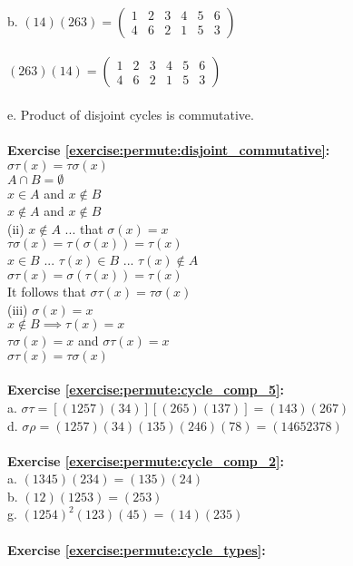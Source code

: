 \\
b. $(14)(263)=\begin{pmatrix}
1 & 2 & 3 & 4 & 5 & 6\\
4 & 6 & 2 & 1 & 5 & 3
\end{pmatrix}$\\
\\
$(263)(14)=\begin{pmatrix}
1 & 2 & 3 & 4 & 5 & 6\\
4 & 6 & 2 & 1 & 5 & 3
\end{pmatrix}$\\
\\
e. Product of disjoint cycles is commutative.\\
\\
\textbf{Exercise \ref{exercise:permute:disjoint_commutative}:}\\
$\sigma\tau(x)=\tau\sigma(x)$\\
$A\cap B=\emptyset$\\
$x\in A$ and $x\not\in B$\\
$x\not\in A$ and $x\not\in B$\\
(ii) $x\not\in A$ ... that $\sigma(x)=x$\\
$\tau\sigma(x)=\tau(\sigma(x))=\tau(x)$\\
$x\in B$ ... $\tau(x)\in B$ ... $\tau(x)\not\in A$\\
$\sigma\tau(x)=\sigma(\tau(x))=\tau(x)$\\
It follows that $\sigma\tau(x)=\tau\sigma(x)$\\
(iii) $\sigma(x)=x$\\
$x\not\in B \implies \tau(x)=x$\\
$\tau\sigma(x)=x$ and $\sigma\tau(x)=x$\\
$\sigma\tau(x)=\tau\sigma(x)$\\
\\
\textbf{Exercise \ref{exercise:permute:cycle_comp_5}:}\\
a. $\sigma\tau=[(1257)(34)][(265)(137)]=(143)(267)$\\
d. $\sigma\rho=(1257)(34)(135)(246)(78)=(14652378)$\\
\\
\textbf{Exercise \ref{exercise:permute:cycle_comp_2}:}\\
a. $(1345)(234)=(135)(24)$\\
b. $(12)(1253)=(253)$\\
g. $(1254)^2(123)(45)=(14)(235)$\\
\\
\textbf{Exercise \ref{exercise:permute:cycle_types}:}\\
